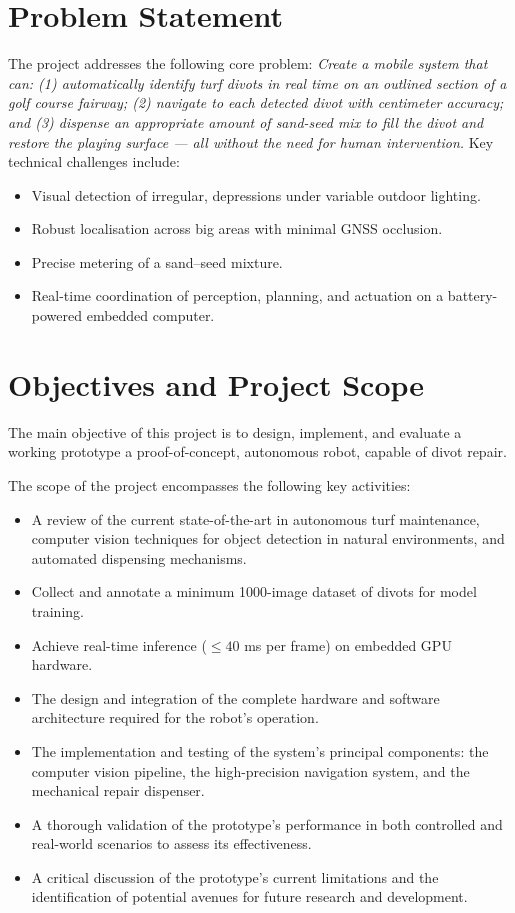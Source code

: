 \section{Problem Statement}
The project addresses the following core problem: \emph{Create a mobile system that can: (1) automatically identify turf divots in real time on an outlined section of a golf course fairway; (2) navigate to each detected divot with centimeter accuracy; and (3) dispense an appropriate amount of sand-seed mix to fill the divot and restore the playing surface — all without the need for human intervention.}
Key technical challenges include:
\begin{itemize}
  \item Visual detection of irregular, depressions under variable outdoor lighting.
  \item Robust localisation across big areas with minimal \gls{GNSS} occlusion.
  \item Precise metering of a sand–seed mixture.
  \item Real-time coordination of perception, planning, and actuation on a battery-powered embedded computer.
\end{itemize}


\section{Objectives and Project Scope}
\label{sec:objectives_scope}
The main objective of this project is to design, implement, and evaluate a working prototype a proof-of-concept, autonomous robot, capable of divot repair.

The scope of the project encompasses the following key activities:
\begin{itemize}
    \item A review of the current state-of-the-art in autonomous turf maintenance, computer vision techniques for object detection in natural environments, and automated dispensing mechanisms.
    \item Collect and annotate a minimum 1000-image dataset of divots for model training.
    \item Achieve real-time inference ($\le\!40$ ms per frame) on embedded \gls{GPU} hardware.
    \item The design and integration of the complete hardware and software architecture required for the robot's operation.
    \item The implementation and testing of the system's principal components: the computer vision pipeline, the high-precision navigation system, and the mechanical repair dispenser.
    \item A thorough validation of the prototype's performance in both controlled and real-world scenarios to assess its effectiveness.
    \item A critical discussion of the prototype's current limitations and the identification of potential avenues for future research and development.
\end{itemize}

